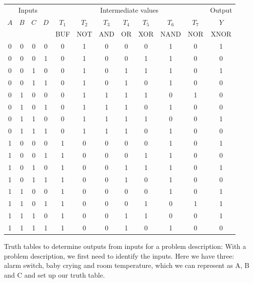 \begin{center}
\renewcommand{\arraystretch}{1.12}
\begin{tabular}{cccc|ccccccc|c}
\toprule
\multicolumn{4}{c|}{Inputs} & \multicolumn{7}{c|}{Intermediate values} & Output \\
\cmidrule(lr){1-4}\cmidrule(lr){5-11}\cmidrule(lr){12-12}
$A$ & $B$ & $C$ & $D$ & $T_1$ & $T_2$ & $T_3$ & $T_4$ & $T_5$ & $T_6$ & $T_7$ & $Y$ \\
{\scriptsize} & {\scriptsize} & {\scriptsize} & {\scriptsize} & \scriptsize BUF & \scriptsize NOT & \scriptsize AND & \scriptsize OR & \scriptsize XOR & \scriptsize NAND & \scriptsize NOR & \scriptsize XNOR \\
\midrule
0 & 0 & 0 & 0 & 0 & 1 & 0 & 0 & 0 & 1 & 0 & 1 \\
0 & 0 & 0 & 1 & 0 & 1 & 0 & 0 & 1 & 1 & 0 & 0 \\
0 & 0 & 1 & 0 & 0 & 1 & 0 & 1 & 1 & 1 & 0 & 1 \\
0 & 0 & 1 & 1 & 0 & 1 & 0 & 1 & 0 & 1 & 0 & 0 \\
0 & 1 & 0 & 0 & 0 & 1 & 1 & 1 & 1 & 0 & 1 & 0 \\
0 & 1 & 0 & 1 & 0 & 1 & 1 & 1 & 0 & 1 & 0 & 0 \\
0 & 1 & 1 & 0 & 0 & 1 & 1 & 1 & 1 & 0 & 0 & 1 \\
0 & 1 & 1 & 1 & 0 & 1 & 1 & 1 & 0 & 1 & 0 & 0 \\
1 & 0 & 0 & 0 & 1 & 0 & 0 & 0 & 0 & 1 & 0 & 1 \\
1 & 0 & 0 & 1 & 1 & 0 & 0 & 0 & 1 & 1 & 0 & 0 \\
1 & 0 & 1 & 0 & 1 & 0 & 0 & 1 & 1 & 1 & 0 & 1 \\
1 & 0 & 1 & 1 & 1 & 0 & 0 & 1 & 0 & 1 & 0 & 0 \\
1 & 1 & 0 & 0 & 1 & 0 & 0 & 0 & 0 & 1 & 0 & 1 \\
1 & 1 & 0 & 1 & 1 & 0 & 0 & 0 & 1 & 0 & 1 & 1 \\
1 & 1 & 1 & 0 & 1 & 0 & 0 & 1 & 1 & 0 & 0 & 1 \\
1 & 1 & 1 & 1 & 1 & 0 & 0 & 1 & 0 & 1 & 0 & 0 \\
\bottomrule
\end{tabular}
\end{center}
Truth tables to determine outputs from inputs for a problem description: With a problem description, we first need to identify the inputs. Here we have three: alarm switch, baby crying and room temperature, which we can represent as A, B and C and set up our truth table. \\\\
